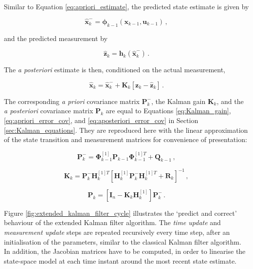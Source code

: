Similar to Equation \ref{eq:apriori_estimate}, the predicted state estimate is given by

\begin{equation}\label{eq:apriori_estimate_extended}
  \hat{\mathbf{x}}^{-}_k = \bm{\phi}_{k-1}(\mathbf{x}_{k-1}, \mathbf{u}_{k-1})\,,
\end{equation}

\noindent
and the predicted measurement by

\begin{equation}\label{eq:predicted_measurement_extended}
  \hat{\mathbf{z}}_k = \mathbf{h}_{k}(\hat{\mathbf{x}}^{-}_{k})\,.
\end{equation}

\noindent
The \emph{a posteriori} estimate is then, conditioned on the actual measurement, 

\begin{equation}\label{eq:aposteriori_estimate_extended}
  \hat{\mathbf{x}}_k = \hat{\mathbf{x}}^-_k + \mathbf{K}_{k}[\mathbf{z}_k-\hat{\mathbf{z}}_k]\,.
\end{equation}

\noindent
The corresponding \emph{a priori} covariance matrix $\mathbf{P}^-_{k}$, the Kalman gain $\mathbf{K}_{k}$, and the \emph{a posteriori} covariance matrix $\mathbf{P}_{k}$ are equal to Equations \ref{eq:Kalman_gain}, \ref{eq:apriori_error_cov}, and \ref{eq:aposteriori_error_cov} in Section \ref{sec:Kalman_equations}. They are reproduced here with the linear approximation of the state transition and measurement matrices for convenience of presentation:

\begin{equation}\label{eq:apriori_error_cov_extended}
  \mathbf{P}^-_{k} = \bm{\Phi}^{[1]}_{k-1} \mathbf{P}_{k-1} \bm{\Phi}^{[1]T}_{k-1} + \mathbf{Q}_{k-1}\,,
\end{equation}

\begin{equation}\label{eq:Kalman_gain_extended}
  \mathbf{K}_{k} = \mathbf{P}^-_k \mathbf{H}^{[1]T}_k[\mathbf{H}^{[1]}_k \mathbf{P}^-_k \mathbf{H}^{[1]T}_k + \mathbf{R}_k]^{-1}\,,
\end{equation}

\begin{equation}\label{eq:aposteriori_error_cov_extended}
  \mathbf{P}_{k} = [\mathbf{I}_n - \mathbf{K}_{k}\mathbf{H}^{[1]}_{k}]\mathbf{P}^-_{k}\,.
\end{equation}

Figure \ref{fig:extended_kalman_filter_cycle} illustrates the `predict and correct' behaviour of the extended Kalman filter algorithm. The \emph{time update} and \emph{measurement update} steps are repeated recursively every time step, after an initialisation of the parameters, similar to the classical Kalman filter algorithm. In addition, the Jacobian matrices have to be computed, in order to linearise the state-space model at each time instant around the most recent state estimate.

